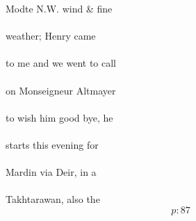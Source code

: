 \documentclass{report}
\begin{document}
	\par{
 	Modte N.W. wind \& fine\ \\\ \\weather; Henry came\ \\\ \\to me and we went to call\ \\\ \\on Monseigneur Altmayer\ \\\ \\to wish him good bye, he\ \\\ \\starts this evening for\ \\\ \\Mardin via Deir, in a\ \\\ \\Takhtarawan, also the\ \\
  \[p: 87 \]

	}


\end{document}
